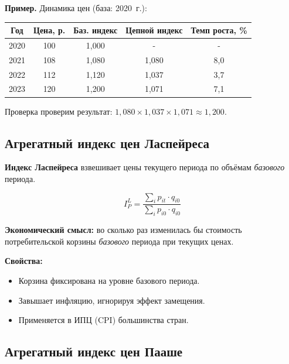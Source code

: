 \documentclass[a4paper]{article}
\begin{document}
	\textbf{Пример.} Динамика цен (база: 2020~г.):
	\begin{center}
		\begin{tabular}{ccccc}
			\toprule
			Год & Цена, р. & Баз. индекс & Цепной индекс & Темп роста, \% \\
			\midrule
			2020 & 100 & 1{,}000 & -   & -   \\
			2021 & 108 & 1{,}080 & 1{,}080 & 8{,}0 \\
			2022 & 112 & 1{,}120 & 1{,}037 & 3{,}7 \\
			2023 & 120 & 1{,}200 & 1{,}071 & 7{,}1 \\
			\bottomrule
		\end{tabular}
	\end{center}
	Проверка проверим результат: $1{,}080 \times 1{,}037 \times 1{,}071 \approx 1{,}200$.


\subsection{Агрегатный индекс цен Ласпейреса}


	\textbf{Индекс Ласпейреса} взвешивает цены текущего периода по объёмам
	\emph{базового} периода.


\begin{equation}
	I_P^L = \frac{\displaystyle\sum_{i} p_{it} \cdot q_{i0}}
	{\displaystyle\sum_{i} p_{i0} \cdot q_{i0}}
\end{equation}

\noindent\textbf{Экономический смысл:} во сколько раз изменилась бы стоимость
потребительской корзины \emph{базового} периода при текущих ценах.

\noindent\textbf{Свойства:}
\begin{itemize}[noitemsep]
	\item Корзина фиксирована на уровне базового периода.
	\item Завышает инфляцию, игнорируя эффект замещения.
	\item Применяется в ИПЦ (CPI) большинства стран.
\end{itemize}

\subsection{Агрегатный индекс цен Пааше}
\end{document}
